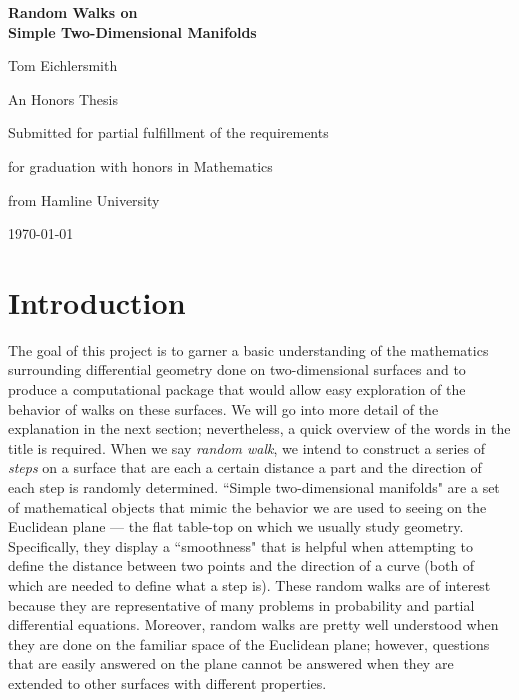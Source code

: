 \documentclass[12pt]{article}
\begin{document}
\begin{titlepage}
	\centering
	\vspace*{\fill}
	{\LARGE\bfseries Random Walks on\\ Simple Two-Dimensional Manifolds\par}
	\vspace{5cm}
	{\large Tom Eichlersmith\par}
	\vspace{5cm}
	An Honors Thesis\par
	Submitted for partial fulfillment of the requirements\par
	for graduation with honors in Mathematics\par
	from Hamline University\par
	\vspace{1em}
	{\today\par}
	\vspace*{\fill}
\end{titlepage}

\section{Introduction}
	The goal of this project is to garner a basic understanding of the mathematics surrounding differential geometry done on two-dimensional surfaces and to produce a computational package that would allow easy exploration of the behavior of walks on these surfaces.
	We will go into more detail of the explanation in the next section; nevertheless, a quick overview of the words in the title is required.
	When we say \emph{random walk}, we intend to construct a series of \emph{steps} on a surface that are each a certain distance a part and the direction of each step is randomly determined. 
	``Simple two-dimensional manifolds" are a set of mathematical objects that mimic the behavior we are used to seeing on the Euclidean plane --- the flat table-top on which we usually study geometry.
	Specifically, they display a ``smoothness" that is helpful when attempting to define the distance between two points and the direction of a curve (both of which are needed to define what a step is).
	These random walks are of interest because they are representative of many problems in probability and partial differential equations.
	Moreover, random walks are pretty well understood when they are done on the familiar space of the Euclidean plane; however, questions that are easily answered on the plane cannot be answered when they are extended to other surfaces with different properties.
	
\end{document}
